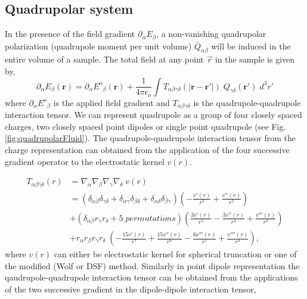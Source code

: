 \subsection{Quadrupolar system}
In the presence of the field gradient $\partial_\alpha {E}_\beta $, a
non-vanishing quadrupolar polarization (quadrupole moment per unit
volume) $\bar{Q}_{\alpha\beta}$ will be induced in the entire volume
of a sample. The total field at any point $\vec{r}$ in the sample is
given by,
\begin{equation}
\partial_\alpha E_\beta(\textbf{r}) = \partial_\alpha {E^o}_\beta(\textbf{r}) + \frac{1}{4\pi \epsilon_o}\int T_{\alpha\beta\gamma\delta}(|{\textbf{r}-\textbf{r}'}|)\;{Q}_{\gamma\delta}(\textbf{r}')\; d^3r'
\label{gradMaxwell}
\end{equation}
where $\partial_\alpha {E^o}_\beta$ is the applied field gradient and $ T_{\alpha\beta\gamma\delta}$ is the quadrupole-quadrupole interaction tensor. We can represent quadrupole as a group of four closely spaced charges, two closely spaced point dipoles or single point quadrupole (see Fig. \ref{fig:quadrupolarFluid}). The quadrupole-quadrupole interaction tensor from the charge representation can obtained from the application of the four successive gradient operator to the electrostatic kernel $v(r)$. 

\begin{equation}
\begin{split}
T_{\alpha\beta\gamma\delta}(r) &=\nabla_\alpha \nabla_\beta \nabla_\gamma \nabla_\delta\;v(r) 
\\ &= \left(\delta_{\alpha\beta}\delta_{\gamma\delta} + \delta_{\alpha\gamma}\delta_{\beta\delta}+ \delta_{\alpha\delta}\delta_{\beta\gamma}\right)\left(-\frac{v'(r)}{r^3} + \frac{v''(r)}{r^2}\right) 
\\ &+ \left(\delta_{\alpha\beta} r_\gamma r_\delta + 5 \; permutations \right) \left(\frac{3v'(r)}{r^5}-\frac{3v''(r)}{r^4} + \frac{v'''(r)}{r^3}\right) 
\\ &+ r_\alpha r_\beta r_\gamma r_\delta\; \left(-\frac{15v'(r)}{r^7}+\frac{15v''(r)}{r^6}-\frac{6v'''(r)}{r^5} + \frac{v''''(r)}{r^4}\right), 
\end{split}
\label{quadCharge}
\end{equation}
where $v(r)$ can either be electrostatic kernel for spherical truncation or one of the modified (Wolf or DSF) method. Similarly in point dipole representation the qaudrupole-quadrupole interaction tensor can be obtained from the applications of the two successive gradient in the dipole-dipole interaction tensor,

